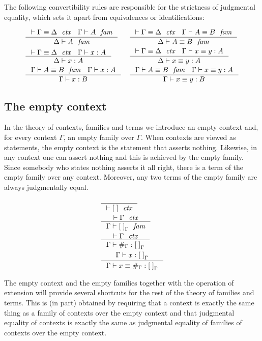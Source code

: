 The following convertibility rules are responsible for the strictness
of judgmental equality, which sets it apart from equivalences or identifications:

\begin{align*}
& \inference
  { \jctxeq{\Gamma}{\Delta}
    \jfam{\Gamma}{A}
    }
  { \jfam{\Delta}{A}
    }
& & \inference
    { \jctxeq{\Gamma}{\Delta}
      \jfameq{\Gamma}{A}{B}
      }
    { \jfameq{\Delta}{A}{B}
      }
    \\
& \inference
  { \jctxeq{\Gamma}{\Delta}
    \jterm{\Gamma}{A}{x}
    }
  { \jterm{\Delta}{A}{x}
    }
& & \inference
    { \jctxeq{\Gamma}{\Delta}
      \jtermeq{\Gamma}{A}{x}{y}
      }
    { \jtermeq{\Delta}{A}{x}{y}
      }
    \\
& \inference
  { \jfameq{\Gamma}{A}{B}
    \jterm{\Gamma}{A}{x}
    }
  { \jterm{\Gamma}{B}{x}
    }
& & \inference
    { \jfameq{\Gamma}{A}{B}
      \jtermeq{\Gamma}{A}{x}{y}
      }
    { \jtermeq{\Gamma}{B}{x}{y}
      }
\end{align*}

\subsection{The empty context}
In the theory of contexts, families and terms we introduce an empty context and,
for every context $\Gamma$, an empty family over $\Gamma$. 
When contexts are viewed as statements, the empty context is the statement that
asserts nothing. Likewise, in any context one can assert nothing and this is
achieved by the empty family. 
Since somebody who states nothing asserts it all right, there is a term of the empty
family over any context. Moreover, any two terms of the empty family are always
judgmentally equal.

\begin{align}
& \inference
  { }
  { \jctx{\emptyc}
    }
  \\
& \inference
  { \jctx{\Gamma}
    }
  { \jfam{\Gamma}{\emptyf[\Gamma]}
    }
  \\
& \inference
  { \jctx{\Gamma}
    }
  { \jterm{\Gamma}{\emptyf[\Gamma]}{\emptytm[\Gamma]}
    }
  \\
& \inference
  { \jterm{\Gamma}{\emptyf[\Gamma]}{x}
    }
  { \jtermeq
      {\Gamma}
      {\emptyf[\Gamma]}
      {x}
      {\emptytm[\Gamma]}
    }
\end{align}

The empty context and the empty families together with the operation of
extension will provide several shortcuts for the rest
of the theory of families and terms. This is (in part) obtained by requiring
that a context is exactly the same thing as a family of contexts over the
empty context and that judgmental equality of contexts is exactly the same
as judgmental equality of families of contexts over the empty context. 

